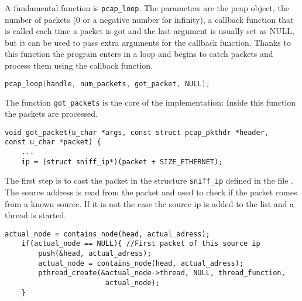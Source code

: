 A fundamental function is \lstinline|pcap_loop|.
The parameters are the pcap object,
the number of packets (0 or a negative number for infinity), a callback function
 that is called each time a packet
is got and the last argument is usually set as NULL, but it can be used to pass extra arguments for the
callback function.
Thanks to this function the program enters in a loop and begins to catch packets and process them using the callback function.
\begin{lstlisting}[frame= single, language=C, caption=Pcap functions called to start getting the packets on the network.]
pcap_loop(handle, num_packets, got_packet, NULL);
\end{lstlisting}
The function \lstinline|got_packets| is the core of the implementation: Inside this function the packets are processed.

\begin{lstlisting}[style=MyC]
void got_packet(u_char *args, const struct pcap_pkthdr *header, 
const u_char *packet) {
	...
	ip = (struct sniff_ip*)(packet + SIZE_ETHERNET);
\end{lstlisting}

The first step is to cast the packet in the structure \lstinline|sniff_ip| defined in the file .
The source address is read from the packet and used to check if the packet comes from a known source. If it is not the 
case the source ip is added to the list and a thread is started.

\begin{lstlisting}[style=MyC]
	actual_node = contains_node(head, actual_adress);
	if(actual_node == NULL){ //First packet of this source ip
		push(&head, actual_adress);
		actual_node = contains_node(head, actual_adress);
		pthread_create(&actual_node->thread, NULL, thread_function, 
						actual_node);
	}
\end{lstlisting}


